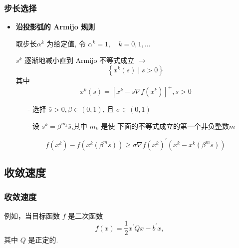 \documentclass[handout,10pt]{beamer}
\begin{document}
	\begin{frame}
		\frametitle{步长选择}
		\begin{itemize}
			\item \textbf{沿投影弧的 Armijo 规则}
			
			取步长$\alpha^{k}$ 为给定值, 令 $\alpha^{k}=1, \quad k=0,1, \ldots$
			
			$s^{k}$ 逐渐地减小直到 Armijo 不等式成立
			$\rightarrow$
			$$
			\left\{x^{k}(s) \mid s>0\right\}
			$$
			其中
			$$
			x^{k}(s)=\left[x^{k}-s \nabla f\left(x^{k}\right)\right]^{+},s>0
			$$
			\begin{itemize}
				\item[-]选择 $\bar{s}>0, \beta \in(0,1)$, 且 $\sigma \in(0,1)$
				\item[-]设 $s^{k}=\beta^{m_{k}} \bar{s}$,其中 $m_{k}$ 是使
				下面的不等式成立的第一个非负整数$m$
			\end{itemize}
			$$
			f\left(x^{k}\right)-f\left(x^{k}\left(\beta^{m} \bar{s}\right)\right) \geq \sigma \nabla f\left(x^{k}\right)^{\prime}\left(x^{k}-x^{k}\left(\beta^{m} \bar{s}\right)\right)
			$$
		\end{itemize}
	\end{frame}
	\subsection{收敛速度}
	\begin{frame}
		\frametitle{收敛速度}
		例如，当目标函数 $f$ 是二次函数
		$$
		f(x)=\frac{1}{2} x^{\prime} Q x-b^{\prime} x,
		$$
		其中 $Q$ 是正定的.
		
	\end{frame}
\end{document}

